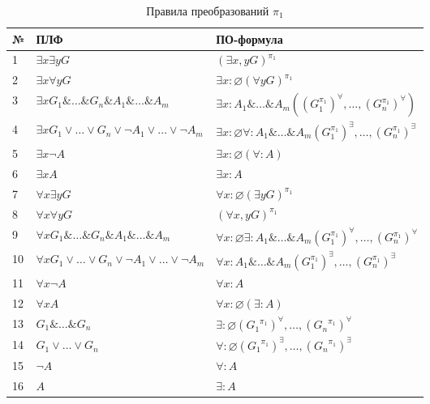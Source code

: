 \documentclass[a4paper]{jctart15b}
\begin{document}
\begin{table}[htbp]
	\caption{Правила преобразований $\pi_1$}\vspace*{2mm}
	
	\begin{tabular}{|l|l|l|}
		\hline
		\textbf{№} & \textbf{ПЛФ} & \textbf{ПО-формула} \\
		\hline
		1 & $\exists{x}\exists{y}G$ & $(\exists{x,y}G)^{\pi_1}$ \\
		\hline
		2 & $\exists{x}\forall{y}G$ & $\exists{x}\colon\varnothing(\forall{y}G)^{\pi_1}$ \\
		\hline
		3 & $\exists{x}G_1 \& \ldots \& G_n \& A_1 \& \ldots \& A_m $ & $\exists{x}\colon A_1 \& \ldots \& A_m ((G_{1}^{\pi_1})^{\forall},\ldots,(G_{n}^{\pi_1})^{\forall})$ \\
		\hline
		4 & $\exists{x}G_1 \vee \ldots \vee G_n \vee \neg A_1 \vee \ldots \vee \neg A_m$ & $\exists{x}\colon\varnothing \forall\colon A_1 \& \ldots \& A_m (G_{1}^{\pi_1})^{\exists},\ldots,(G_{n}^{\pi_1})^{\exists}$ \\
		\hline
		5 & $\exists{x}\neg A$ & $\exists{x}\colon\varnothing(\forall\colon A)$  \\
		\hline
		6 & $\exists{x}A$ & $\exists{x}\colon A$ \\
		\hline
		7 & $\forall{x}\exists{y}G$ & $\forall{x}\colon\varnothing(\exists{y}G)^{\pi_1}$ \\
		\hline
		8 & $\forall{x}\forall{y}G$ & $(\forall{x,y}G)^{\pi_1}$ \\
		\hline
		9 & $\forall{x}G_1 \& \ldots \& G_n \& A_1 \& \ldots \& A_m$ & $\forall{x}\colon\varnothing \exists\colon A_1 \& \ldots \& A_m (G_{1}^{\pi_1})^{\forall},\ldots,(G_{n}^{\pi_1})^{\forall}$ \\
		\hline
		10 & $\forall{x}G_1 \vee \ldots \vee G_n \vee \neg A_1 \vee \ldots \vee \neg A_m$ & $\forall{x}\colon A_1 \& \ldots \& A_m (G_{1}^{\pi_1})^{\exists},\ldots,(G_{n}^{\pi_1})^{\exists}$ \\
		\hline
		11 & $\forall{x}\neg A$ & $\forall{x}\colon A$ \\
		\hline
		12 & $\forall{x}A$ & $\forall{x}\colon\varnothing (\exists\colon A)$ \\
		\hline
		13 & $G_1 \&\ldots\& G_n$ & $\exists\colon\varnothing({G_1}^{\pi_1})^{\forall},\ldots,({G_n}^{\pi_1})^{\forall}$ \\
		\hline
		14 & $G_1 \vee\ldots\vee G_n$ & $\forall\colon\varnothing({G_1}^{\pi_1})^{\exists},\ldots,({G_n}^{\pi_1})^{\exists}$ \\
		\hline
		15 & $\neg A$ & $\forall \colon A$ \\
		\hline
		16 & $A$ & $\exists \colon A$ \\
		\hline
	\end{tabular}
\end{table}
\end{document}
